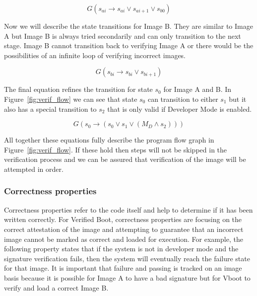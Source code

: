\documentclass[../report.tex]{subfiles}
\begin{document}
\begin{equation}
    G(s_{ai} \to s_{ai} \lor s_{ai+1} \lor s_{b0})
\end{equation}

Now we will describe the state transitions for Image B. 
They are similar to Image A but Image B is always tried secondarily and can only transition to the next stage. 
Image B cannot transition back to verifying Image A or there would be the possibilities of an infinite loop of verifying incorrect images.

\begin{equation}
    G(s_{bi} \to s_{bi} \lor s_{bi+1})
\end{equation}

The final equation refines the transition for state $s_0$ for Image A and B.
In Figure~\ref{fig:verif_flow} we can see that state $s_0$ can transition to either $s_1$ but it also has a special transition to $s_2$ that is only valid if Developer Mode is enabled.

\begin{equation}
    G(s_0 \to (s_0 \lor s_{1} \lor (M_D \land s_{2})))
\end{equation}

All together these equations fully describe the program flow graph in Figure~\ref{fig:verif_flow}. 
If these hold then steps will not be skipped in the verification process and we can be assured that verification of the image will be attempted in order.



\subsubsection{Correctness properties}

Correctness properties refer to the code itself and help to determine if it has been written correctly.
For Verified Boot, correctness properties are focusing on the correct attestation of the image and attempting to guarantee that an incorrect image cannot be marked as correct and loaded for execution.
For example, the following property states that if the system is not in developer mode and the signature verification fails, then the system will eventually reach the failure state for that image.
It is important that failure and passing is tracked on an image basis because it is possible for Image A to have a bad signature but for Vboot to verify and load a correct Image B.
\end{document}
